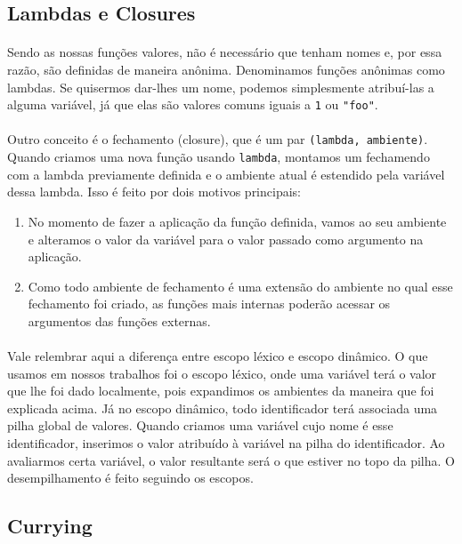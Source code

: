 \documentclass[11pt]{article}
\begin{document}
\subsection{Lambdas e Closures}
\label{sec:org3ef84b2}
\paragraph{} Sendo as nossas funções valores, não é necessário que tenham nomes e, por essa razão, são definidas de maneira anônima. Denominamos funções anônimas como lambdas. Se quisermos dar-lhes um nome, podemos simplesmente atribuí-las a alguma variável, já que
elas são valores comuns iguais a \texttt{1} ou \texttt{"foo"}.

\paragraph{} Outro conceito é o fechamento (closure), que é um par \texttt{(lambda, ambiente)}. Quando criamos uma nova função
usando \texttt{lambda}, montamos um fechamendo com a lambda previamente definida e o ambiente atual é estendido pela variável dessa lambda.
Isso é feito por dois motivos principais:
\begin{enumerate}
\item No momento de fazer a aplicação da função definida, vamos ao seu ambiente e alteramos o valor da variável para o valor passado como argumento na aplicação.
\item Como todo ambiente de fechamento é uma extensão do ambiente no qual esse fechamento foi criado, as funções mais internas poderão acessar os argumentos das funções externas.
\end{enumerate}

\paragraph{} Vale relembrar aqui a diferença entre escopo léxico e escopo dinâmico. O que usamos em nossos trabalhos foi o escopo léxico, onde uma
variável terá o valor que lhe foi dado localmente, pois expandimos os ambientes da maneira que foi explicada acima. Já no escopo dinâmico,
todo identificador terá associada uma pilha global de valores. Quando criamos uma variável cujo nome é esse identificador, inserimos o
valor atribuído à variável na pilha do identificador. Ao avaliarmos certa variável, o valor resultante será o que estiver no
topo da pilha. O desempilhamento é feito seguindo os escopos.

\subsection{Currying}
\label{sec:org8ae8eaa}
\end{document}
